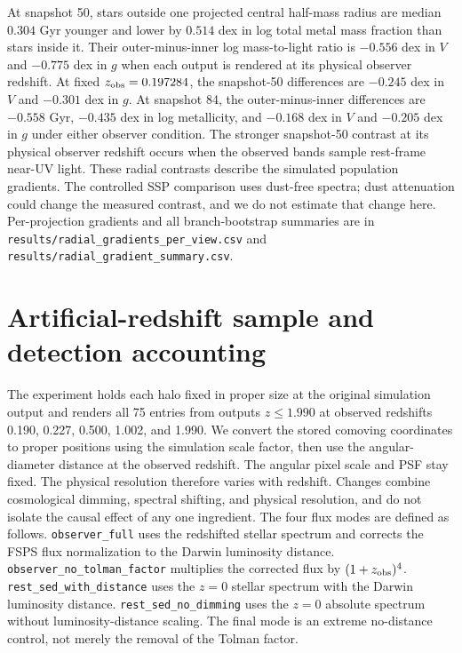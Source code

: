 \documentclass[usenatbib]{mnras}
\begin{document}
At snapshot 50, stars outside one projected central half-mass radius are
median $0.304$ Gyr younger and lower by $0.514$ dex in log total metal mass
fraction than stars inside it. Their outer-minus-inner log mass-to-light
ratio is $-0.556$ dex in $V$ and $-0.775$ dex in $g$ when each output is rendered at
its physical observer redshift. At fixed $z_{\rm obs}=0.197284$, the
snapshot-50 differences are $-0.245$ dex in $V$ and $-0.301$ dex in $g$.
At snapshot 84, the outer-minus-inner differences are $-0.558$ Gyr,
$-0.435$ dex in log metallicity, and $-0.168$ dex in $V$ and $-0.205$ dex
in $g$ under either observer condition. The stronger snapshot-50 contrast
at its physical observer redshift occurs when the observed bands sample
rest-frame near-UV light. These radial contrasts describe the simulated
population gradients. The controlled SSP comparison uses dust-free spectra;
dust attenuation could change the measured contrast, and we do not estimate
that change here. Per-projection gradients and
all branch-bootstrap summaries are in
\texttt{results/radial\_gradients\_per\_view.csv} and
\texttt{results/radial\_gradient\_summary.csv}.

\section{Artificial-redshift sample and detection accounting}
The experiment holds each halo fixed in proper size at the original simulation
output and renders all 75 entries from outputs $z\leq1.990$ at observed
redshifts 0.190, 0.227, 0.500, 1.002, and 1.990. We convert the stored
comoving coordinates to proper positions using the simulation scale factor,
then use the angular-diameter distance at the observed redshift. The angular
pixel scale and PSF stay fixed. The physical resolution therefore varies
with redshift. Changes combine
cosmological dimming, spectral shifting, and physical resolution, and
do not isolate the causal effect of any one ingredient. The four flux
modes are defined as follows. \texttt{observer\_full} uses the redshifted
stellar spectrum and corrects the FSPS flux normalization to the Darwin
luminosity distance. \texttt{observer\_no\_tolman\_factor} multiplies
the corrected flux by $(1+z_{\rm obs})^4$. \texttt{rest\_sed\_with\_distance}
uses the $z=0$ stellar spectrum with the Darwin luminosity distance.
\texttt{rest\_sed\_no\_dimming} uses the $z=0$ absolute spectrum
without luminosity-distance scaling. The final mode is an extreme no-distance control,
not merely the removal of the Tolman factor.
\end{document}
